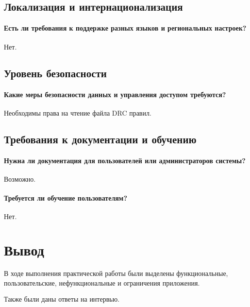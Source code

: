 \subsection{Локализация и интернационализация}

\paragraph{Есть ли требования к поддержке разных языков
и региональных настроек?}

Нет.

\subsection{Уровень безопасности}
\paragraph{Какие меры безопасности данных и управления доступом требуются?}

Необходимы права на чтение файла DRC правил.

\subsection{Требования к документации и обучению}
\paragraph{Нужна ли документация для пользователей
или администраторов системы?}

Возможно.

\paragraph{Требуется ли обучение пользователям?}

Нет.

\clearpage

\section*{\LARGE Вывод}

В ходе выполнения практической работы были выделены
функциональные, пользовательские, нефункциональные
и ограничения приложения.\par
Также были даны ответы на интервью.

